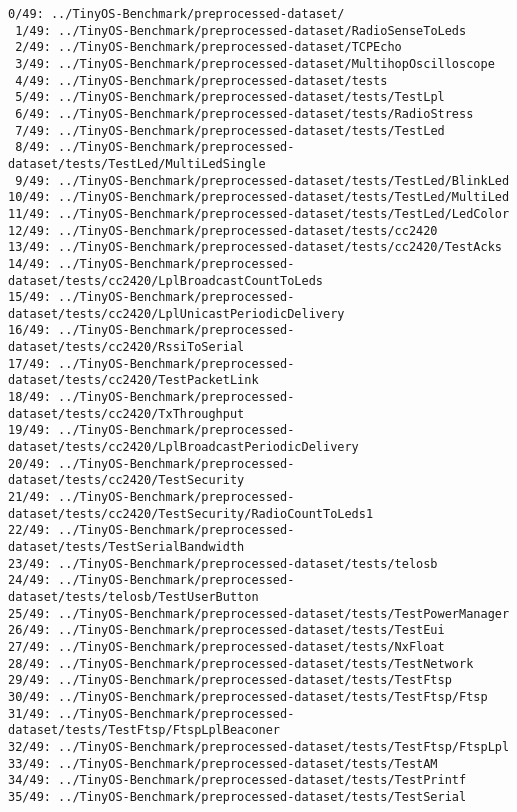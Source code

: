 \documentclass[11pt]{article}
\begin{document}
    \begin{Verbatim}[commandchars=\\\{\}]
 0/49: ../TinyOS-Benchmark/preprocessed-dataset/
 1/49: ../TinyOS-Benchmark/preprocessed-dataset/RadioSenseToLeds
 2/49: ../TinyOS-Benchmark/preprocessed-dataset/TCPEcho
 3/49: ../TinyOS-Benchmark/preprocessed-dataset/MultihopOscilloscope
 4/49: ../TinyOS-Benchmark/preprocessed-dataset/tests
 5/49: ../TinyOS-Benchmark/preprocessed-dataset/tests/TestLpl
 6/49: ../TinyOS-Benchmark/preprocessed-dataset/tests/RadioStress
 7/49: ../TinyOS-Benchmark/preprocessed-dataset/tests/TestLed
 8/49: ../TinyOS-Benchmark/preprocessed-dataset/tests/TestLed/MultiLedSingle
 9/49: ../TinyOS-Benchmark/preprocessed-dataset/tests/TestLed/BlinkLed
10/49: ../TinyOS-Benchmark/preprocessed-dataset/tests/TestLed/MultiLed
11/49: ../TinyOS-Benchmark/preprocessed-dataset/tests/TestLed/LedColor
12/49: ../TinyOS-Benchmark/preprocessed-dataset/tests/cc2420
13/49: ../TinyOS-Benchmark/preprocessed-dataset/tests/cc2420/TestAcks
14/49: ../TinyOS-Benchmark/preprocessed-dataset/tests/cc2420/LplBroadcastCountToLeds
15/49: ../TinyOS-Benchmark/preprocessed-dataset/tests/cc2420/LplUnicastPeriodicDelivery
16/49: ../TinyOS-Benchmark/preprocessed-dataset/tests/cc2420/RssiToSerial
17/49: ../TinyOS-Benchmark/preprocessed-dataset/tests/cc2420/TestPacketLink
18/49: ../TinyOS-Benchmark/preprocessed-dataset/tests/cc2420/TxThroughput
19/49: ../TinyOS-Benchmark/preprocessed-dataset/tests/cc2420/LplBroadcastPeriodicDelivery
20/49: ../TinyOS-Benchmark/preprocessed-dataset/tests/cc2420/TestSecurity
21/49: ../TinyOS-Benchmark/preprocessed-dataset/tests/cc2420/TestSecurity/RadioCountToLeds1
22/49: ../TinyOS-Benchmark/preprocessed-dataset/tests/TestSerialBandwidth
23/49: ../TinyOS-Benchmark/preprocessed-dataset/tests/telosb
24/49: ../TinyOS-Benchmark/preprocessed-dataset/tests/telosb/TestUserButton
25/49: ../TinyOS-Benchmark/preprocessed-dataset/tests/TestPowerManager
26/49: ../TinyOS-Benchmark/preprocessed-dataset/tests/TestEui
27/49: ../TinyOS-Benchmark/preprocessed-dataset/tests/NxFloat
28/49: ../TinyOS-Benchmark/preprocessed-dataset/tests/TestNetwork
29/49: ../TinyOS-Benchmark/preprocessed-dataset/tests/TestFtsp
30/49: ../TinyOS-Benchmark/preprocessed-dataset/tests/TestFtsp/Ftsp
31/49: ../TinyOS-Benchmark/preprocessed-dataset/tests/TestFtsp/FtspLplBeaconer
32/49: ../TinyOS-Benchmark/preprocessed-dataset/tests/TestFtsp/FtspLpl
33/49: ../TinyOS-Benchmark/preprocessed-dataset/tests/TestAM
34/49: ../TinyOS-Benchmark/preprocessed-dataset/tests/TestPrintf
35/49: ../TinyOS-Benchmark/preprocessed-dataset/tests/TestSerial

\end{Verbatim}
\end{document}
